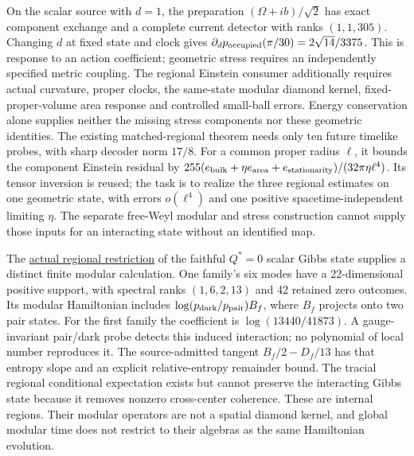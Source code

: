 On the scalar source with $d=1$, the preparation
$(\Omega+ib)/\sqrt2$ has exact component exchange and a complete current
detector with ranks $(1,1,305)$. Changing $d$ at fixed state and clock
gives $\partial_d p_{\rm occupied}(\pi/30)=2\sqrt{14}/3375$.
This is response to an action coefficient; geometric stress requires
an independently specified metric coupling. The regional Einstein
consumer additionally requires actual curvature, proper clocks, the
same-state modular diamond kernel, fixed-proper-volume area response
and controlled small-ball errors. Energy conservation alone supplies
neither the missing stress components nor these geometric identities.
The existing matched-regional theorem needs only ten future timelike
probes, with sharp decoder norm $17/8$. For a common proper radius
$\ell$, it bounds the component Einstein residual by
$255(e_{\rm bulk}+\eta e_{\rm area}+e_{\rm stationarity})/
(32\pi\eta\ell^4)$. Its tensor inversion is reused; the task is to
realize the three regional estimates on one geometric state, with errors
$o(\ell^4)$ and one positive spacetime-independent limiting $\eta$.
The separate free-Weyl modular and stress construction cannot supply
those inputs for an interacting state without an identified map.

The \href{https://github.com/FloatingPragma/observer-patch-holography/blob/main/model/particle_regional_geometry/PROOF.md}{actual regional restriction}
of the faithful $Q^*=0$ scalar Gibbs state supplies a distinct finite
modular calculation. One family's six modes have a 22-dimensional
positive support, with spectral ranks $(1,6,2,13)$ and 42 retained
zero outcomes. Its modular Hamiltonian includes
$\log(p_{\rm dark}/p_{\rm pair})B_f$, where $B_f$ projects onto two
pair states. For the first family the coefficient is
$\log(13440/41873)$. A gauge-invariant pair/dark probe detects this
induced interaction; no polynomial of local number reproduces it.
The source-admitted tangent $B_f/2-D_f/13$ has that entropy slope and
an explicit relative-entropy remainder bound. The tracial regional
conditional expectation exists but cannot preserve the interacting
Gibbs state because it removes nonzero cross-center coherence.
These are internal regions. Their modular operators are not a spatial
diamond kernel, and global modular time does not restrict to their
algebras as the same Hamiltonian evolution.
